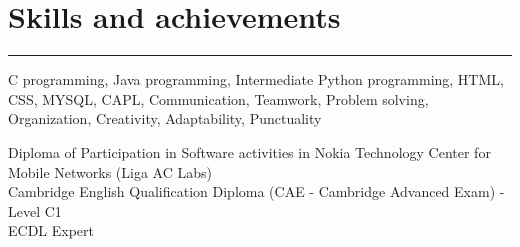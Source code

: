 \documentclass[]{mihocandreea-resume}
\begin{document}
\begin{minipage}[t]{0.66\textwidth}
\section{Skills and achievements} 
\noindent\rule{12.5cm}{0.4pt}
\noindent
\hspace{5em}%
\begin{minipage}{0.85\textwidth\vspace{2pt}}
C programming, Java programming, Intermediate Python programming, HTML, CSS, MYSQL, CAPL, Communication, Teamwork, Problem solving,
Organization, Creativity, Adaptability, Punctuality
\end{minipage}
\noindent
\hspace{5em}%
\begin{minipage}{0.85\textwidth\vspace{2pt}}
Diploma of Participation in Software activities in Nokia Technology Center for Mobile Networks (Liga AC Labs)\\
Cambridge English Qualification Diploma (CAE - Cambridge Advanced Exam) - Level C1\\
ECDL Expert
\end{minipage}

\end{minipage}
\end{document}
